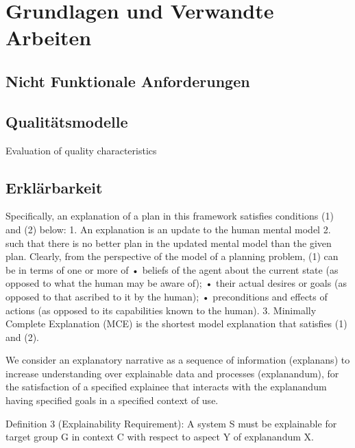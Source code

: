 \chapter{Grundlagen und Verwandte Arbeiten}

\section{Nicht Funktionale Anforderungen}

\cite{chung2009non}

\cite{schneider2012abenteuer}

\section{Qualitätsmodelle}

\cite{schneider2012abenteuer}

Evaluation of quality characteristics

\section{Erklärbarkeit}

Specifically, an explanation of a plan in this framework satisfies conditions (1) and (2) below: 1. An explanation is an update to the human mental model 2. such that there is no better plan in the updated mental model than the given plan. Clearly, from the perspective of the model of a planning problem, (1) can be in terms of one or more of • beliefs of the agent about the current state (as opposed to what the human may be aware of); • their actual desires or goals (as opposed to that ascribed to it by the human); • preconditions and effects of actions (as opposed to its capabilities known to the human). 3. Minimally Complete Explanation (MCE) is the shortest model explanation that satisfies (1) and (2). \cite{zahedi_towards_2019}

We consider an explanatory narrative as a sequence of information (explanans) to increase understanding over explainable data and processes (explanandum), for the satisfaction of a specified explainee that interacts with the explanandum having specified goals in a specified context of use. \cite{sovrano_modelling_2020}

\cite{chazette_end-users_nodate}

\cite{chazette2020explainability}

Definition 3 (Explainability Requirement): A system S must be explainable for target group G in context C with respect to aspect Y of explanandum X. \cite{kohl_explainability_2019}

